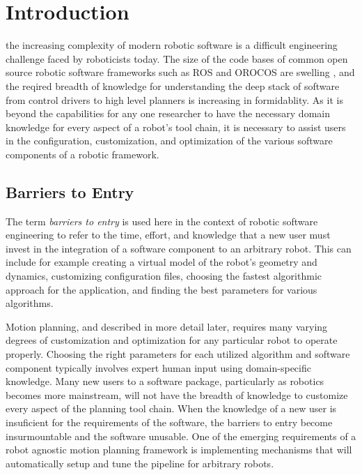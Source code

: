 \documentclass[10pt,journal,compsoc]{joser1}
\begin{document}
\maketitle


\section{Introduction}
 {the increasing complexity of modern robotic software is a difficult engineering challenge faced by roboticists today. The size of the code bases of common open source robotic software frameworks such as ROS \cite{quigley2009ros} and OROCOS \cite{bruyninckx2001open} are swelling \cite{makarenko2007benefits}, and the reqired breadth of knowledge for understanding the deep stack of software from control drivers to high level planners is increasing in formidablity. As it is beyond the capabilities for any one researcher to have the necessary domain knowledge for every aspect of a robot's tool chain, it is necessary to assist users in the configuration, customization, and optimization of the various software components of a robotic framework. 

\subsection{Barriers to Entry}

The term \textit{barriers to entry} is used here in the context of robotic software engineering to refer to the time, effort, and knowledge that a new user must invest in the integration of a software component to an arbitrary robot. This can include for example creating a virtual model of the robot's geometry and dynamics, customizing configuration files, choosing the fastest algorithmic approach for the application, and finding the best parameters for various algorithms. 

Motion planning, and described in more detail later, requires many varying degrees of customization and optimization for any particular robot to operate properly. Choosing the right parameters for each utilized algorithm and software component typically involves expert human input using domain-specific knowledge. Many new users to a software package, particularly as robotics becomes more mainstream, will not have the breadth of knowledge to customize every aspect of the planning tool chain. When the knowledge of a new user is insuficient for the requirements of the software, the barriers to entry become insurmountable and the software unusable. One of the emerging requirements of a robot agnostic motion planning framework is implementing mechanisms that will automatically setup and tune the pipeline for arbitrary robots.

}
\end{document}
